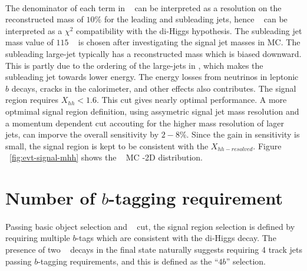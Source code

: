 \paragraph{}
The denominator of each term in \Xhh~ can be interpreted as a resolution on the reconstructed mass of $10\%$ for the leading and subleading jets, hence \Xhh~ can be interpreted as a $\chi^2$ compatibility with the di-Higgs hypothesis.
The subleading jet mass value of $115$ \GeV~ is chosen after investigating the signal jet masses in MC. 
The subleading large-\R jet typically has a reconstructed mass which is biased downward. 
This is partly due to the ordering of the large-\R jets in \pt, which makes the subleading jet towards lower energy. 
The energy losses from neutrinos in leptonic $b$ decays, cracks in the calorimeter, and other effects also contributes. 
The signal region requires $X_{hh} < 1.6$. 
This cut gives nearly optimal performance. 
A more optmimal signal region definition, using assymetric signal jet mass resolution and a momentum dependent cut accouting for the higher mass resolution of lager \pt~ jets, can imporve the overall sensitivity by $2-8\%$.
Since the gain in sensitivity is small, the signal region is kept to be consistent with the $X_{hh-resolved}$. Figure ~\ref{fig:evt-signal-mhh} shows the \Grav~ MC \mlead-\msubl 2D distribution.


\section{Number of $b$-tagging requirement}
\paragraph{}
Passing basic object selection and \Xhh~ cut, the signal region selection is defined by requiring multiple $b$-tags which are consistent with the di-Higgs decay. 
The presence of two \hbb~ decays in the final state naturally suggests requiring 4 track jets passing $b$-tagging requirements, and this is defined as the ``$4b$'' selection.

